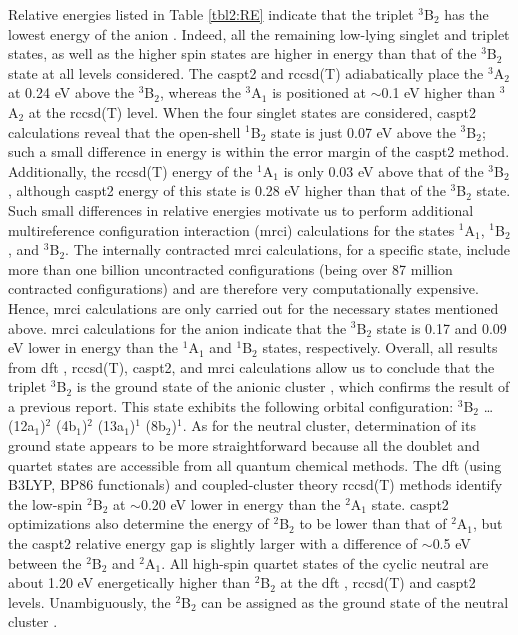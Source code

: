 \begin{refsection}
Relative energies listed in Table \ref{tbl2:RE} indicate that the triplet $^3$B$_2$ has the lowest energy of the anion . Indeed, all the remaining low-lying singlet and triplet states, as well as the higher spin states are higher in energy than that of the $^3$B$_2$ state at all levels considered. The \acrshort{caspt2} and \acrshort{rccsd}(T) adiabatically place the $^3$A$_2$ at 0.24 eV above the $^3$B$_2$, whereas the $^3$A$_1$ is positioned at $\sim$0.1 eV higher than $^3$A$_2$ at the \acrshort{rccsd}(T) level. When the four singlet states are considered, \acrshort{caspt2} calculations reveal that the open-shell $^1$B$_2$ state is just 0.07 eV above the $^3$B$_2$; such a small difference in energy is within the error margin of the \acrshort{caspt2} method. Additionally, the \acrshort{rccsd}(T) energy of the $^1$A$_1$ is only 0.03 eV above that of the $^3$B$_2$, although \acrshort{caspt2} energy of this state is 0.28 eV higher than that of the $^3$B$_2$ state. Such small differences in relative energies motivate us to perform additional multireference configuration interaction (\acrshort{mrci}) calculations for the states $^1$A$_1$,  $^1$B$_2$, and $^3$B$_2$. The internally contracted \acrshort{mrci} calculations, for a specific state, include more than one billion uncontracted configurations (being over 87 million contracted configurations) and are therefore very computationally expensive. Hence, \acrshort{mrci} calculations are only carried out for the necessary states mentioned above. \acrshort{mrci} calculations for the anion indicate that the $^3$B$_2$ state is 0.17 and 0.09 eV lower in energy than the $^1$A$_1$ and $^1$B$_2$ states, respectively. Overall, all results from \acrshort{dft} , \acrshort{rccsd}(T), \acrshort{caspt2}, and \acrshort{mrci} calculations allow us to conclude that the triplet $^3$B$_2$ is the ground state of the anionic cluster , which confirms the result of a previous report.\cite{c3:16} This state exhibits the following orbital configuration: $^3$B$_2$ \ldots (12a$_1$)$^2$ (4b$_1$)$^2$ (13a$_1$)$^1$ (8b$_2$)$^1$. As for the neutral cluster, determination of its ground state appears to be more straightforward because all the doublet and quartet states are accessible from all quantum chemical methods. The \acrshort{dft}  (using B3LYP, BP86 functionals) and coupled-cluster theory \acrshort{rccsd}(T) methods identify the low-spin $^2$B$_2$ at $\sim$0.20 eV lower in energy than the $^2$A$_1$ state. \acrshort{caspt2} optimizations also determine the energy of $^2$B$_2$ to be lower than that of $^2$A$_1$, but the \acrshort{caspt2} relative energy gap is slightly larger with a difference of $\sim$0.5 eV between the $^2$B$_2$ and $^2$A$_1$. All high-spin quartet states of the cyclic neutral  are about 1.20 eV energetically higher than $^2$B$_2$ at the \acrshort{dft} , \acrshort{rccsd}(T) and \acrshort{caspt2} levels. Unambiguously, the $^2$B$_2$ can be assigned as the ground state of the neutral cluster .\cite{c3:16}





\end{refsection}
